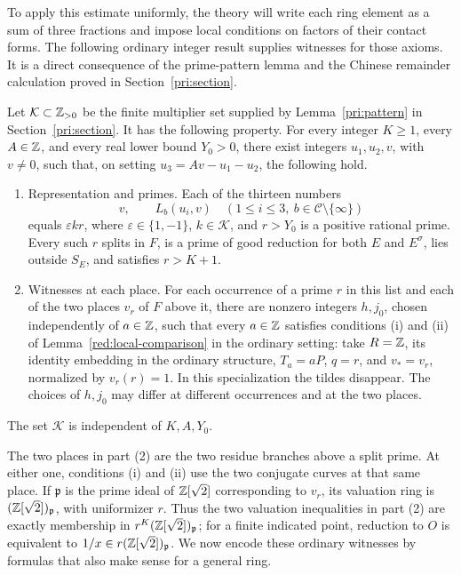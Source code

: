 To apply this estimate uniformly, the theory will write each ring element
as a sum of three fractions and impose local conditions on factors of their
contact forms.  The following ordinary integer result supplies witnesses
for those axioms.  It is a direct consequence of the prime-pattern lemma
and the Chinese remainder calculation proved in Section~\ref{pri:section}.

\begin{corollary}\label{pri:integer-coverage}
Let \(\mathcal K\subset\mathbb Z_{>0}\) be the finite multiplier set supplied
by Lemma~\ref{pri:pattern} in Section~\ref{pri:section}.  It has the
following property.  For every integer \(K\ge1\), every \(A\in\mathbb Z\), and every
real lower bound \(Y_0>0\), there exist integers \(u_1,u_2,v\), with \(v\ne0\),
such that, on setting \(u_3=Av-u_1-u_2\), the following hold.
\begin{enumerate}[label=(\arabic*),leftmargin=*]
\item \textup{Representation and primes.} Each of the thirteen numbers
\begin{equation}\label{pri:coverage-list}
 v,\qquad L_b(u_i,v)
       \quad(1\le i\le3,\ b\in\mathcal C\setminus\{\infty\})
\end{equation}
equals \(\varepsilon k r\), where \(\varepsilon\in\{1,-1\}\),
\(k\in\mathcal K\), and \(r>Y_0\) is a positive rational prime.  Every
such \(r\) splits in \(F\), is a prime of good reduction for both
\(E\) and \(E^\sigma\), lies outside \(S_E\), and satisfies \(r>K+1\).

\item \textup{Witnesses at each place.} For each occurrence of a prime
\(r\) in this list and each of the two places \(v_r\) of \(F\) above it,
there are nonzero integers \(h,j_0\), chosen independently of \(a\in\mathbb Z\),
such that every \(a\in\mathbb Z\) satisfies conditions (i) and (ii) of
Lemma~\ref{red:local-comparison} in the ordinary setting: take \(R=\mathbb Z\),
its identity embedding in the ordinary structure, \(T_a=aP\), \(q=r\),
and \(v_*=v_r\), normalized by \(v_r(r)=1\).  In this specialization
the tildes disappear.  The choices of \(h,j_0\) may differ at different
occurrences and at the two places.
\end{enumerate}
The set \(\mathcal K\) is independent of \(K,A,Y_0\).
\end{corollary}

The two places in part (2) are the two residue branches above a split
prime.  At either one, conditions (i) and (ii) use the two conjugate curves
at that same place.  If \(\mathfrak p\) is the prime ideal of
\(\mathbb Z[\sqrt2]\) corresponding to \(v_r\), its valuation ring is
\((\mathbb Z[\sqrt2])_{\mathfrak p}\), with uniformizer \(r\).  Thus the two
valuation inequalities in part (2) are exactly membership in
\(r^K(\mathbb Z[\sqrt2])_{\mathfrak p}\); for a finite indicated point,
reduction to \(O\) is equivalent to
\(1/x\in r(\mathbb Z[\sqrt2])_{\mathfrak p}\).  We now encode these ordinary
witnesses by formulas that also make sense for a general ring.

